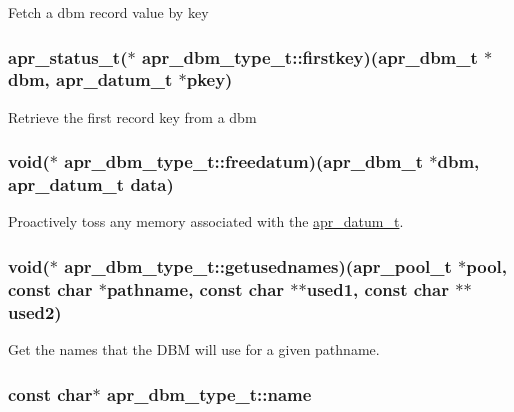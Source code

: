 Fetch a dbm record value by key \hypertarget{structapr__dbm__type__t_a1beec34c5815d4c05e1e03d49be2ccb9}{
\subsubsection[{firstkey}]{\setlength{\rightskip}{0pt plus 5cm}apr\-\_\-status\-\_\-t($\ast$ apr\-\_\-dbm\-\_\-type\-\_\-t\-::firstkey)({\bf apr\-\_\-dbm\-\_\-t} $\ast$dbm, {\bf apr\-\_\-datum\-\_\-t} $\ast$pkey)}}\label{structapr__dbm__type__t_a1beec34c5815d4c05e1e03d49be2ccb9}
Retrieve the first record key from a dbm \hypertarget{structapr__dbm__type__t_a7adb82d3067a0c388d59ac8a7b7c0b20}{
\subsubsection[{freedatum}]{\setlength{\rightskip}{0pt plus 5cm}void($\ast$ apr\-\_\-dbm\-\_\-type\-\_\-t\-::freedatum)({\bf apr\-\_\-dbm\-\_\-t} $\ast$dbm, {\bf apr\-\_\-datum\-\_\-t} data)}}\label{structapr__dbm__type__t_a7adb82d3067a0c388d59ac8a7b7c0b20}
Proactively toss any memory associated with the \hyperlink{structapr__datum__t}{apr\-\_\-datum\-\_\-t}. \hypertarget{structapr__dbm__type__t_a9247cfe582aaf18915bb8552cd5c6bc7}{
\subsubsection[{getusednames}]{\setlength{\rightskip}{0pt plus 5cm}void($\ast$ apr\-\_\-dbm\-\_\-type\-\_\-t\-::getusednames)(apr\-\_\-pool\-\_\-t $\ast$pool, const char $\ast$pathname, const char $\ast$$\ast$used1, const char $\ast$$\ast$used2)}}\label{structapr__dbm__type__t_a9247cfe582aaf18915bb8552cd5c6bc7}
Get the names that the D\-B\-M will use for a given pathname. \hypertarget{structapr__dbm__type__t_af023b97eba22415785caf005fc5dcf64}{
\subsubsection[{name}]{\setlength{\rightskip}{0pt plus 5cm}const char$\ast$ apr\-\_\-dbm\-\_\-type\-\_\-t\-::name}}\label{structapr__dbm__type__t_af023b97eba22415785caf005fc5dcf64}
